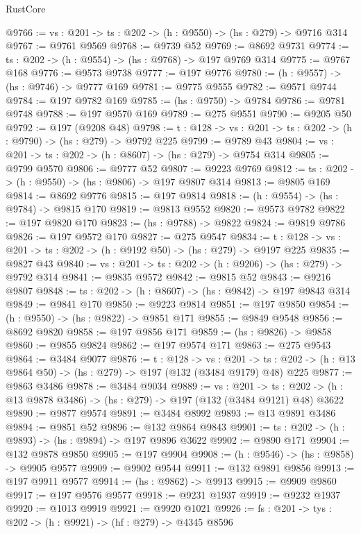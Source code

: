 \begin{lexlean}{RustCore}
\begin{coremodule}
@9766 := {vs : @201} -> {ts : @202} -> (h : @9550) -> (hs : @279) -> @9716 @314
@9767 := @9761 @9569
@9768 := @9739 @52
@9769 := @8692 @9731
@9774 := {ts : @202} -> (h : @9554) -> (hs : @9768) -> @197 @9769 @314
@9775 := @9767 @168
@9776 := @9573 @9738
@9777 := @197 @9776
@9780 := (h : @9557) -> (hs : @9746) -> @9777 @169
@9781 := @9775 @9555
@9782 := @9571 @9744
@9784 := @197 @9782 @169
@9785 := (hs : @9750) -> @9784
@9786 := @9781 @9748
@9788 := @197 @9570 @169
@9789 := @275 @9551
@9790 := @9205 @50
@9792 := @197 (@9208 @48)
@9798 := {t : @128} -> {vs : @201} -> {ts : @202} -> (h : @9790) -> (hs : @279) -> @9792 @225
@9799 := @9789 @43
@9804 := {vs : @201} -> {ts : @202} -> (h : @8607) -> (hs : @279) -> @9754 @314
@9805 := @9799 @9570
@9806 := @9777 @52
@9807 := @9223 @9769
@9812 := {ts : @202} -> (h : @9550) -> (hs : @9806) -> @197 @9807 @314
@9813 := @9805 @169
@9814 := @8692 @9776
@9815 := @197 @9814
@9818 := (h : @9554) -> (hs : @9784) -> @9815 @170
@9819 := @9813 @9552
@9820 := @9573 @9782
@9822 := @197 @9820 @170
@9823 := (hs : @9788) -> @9822
@9824 := @9819 @9786
@9826 := @197 @9572 @170
@9827 := @275 @9547
@9834 := {t : @128} -> {vs : @201} -> {ts : @202} -> (h : @9192 @50) -> (hs : @279) -> @9197 @225
@9835 := @9827 @43
@9840 := {vs : @201} -> {ts : @202} -> (h : @9206) -> (hs : @279) -> @9792 @314
@9841 := @9835 @9572
@9842 := @9815 @52
@9843 := @9216 @9807
@9848 := {ts : @202} -> (h : @8607) -> (hs : @9842) -> @197 @9843 @314
@9849 := @9841 @170
@9850 := @9223 @9814
@9851 := @197 @9850
@9854 := (h : @9550) -> (hs : @9822) -> @9851 @171
@9855 := @9849 @9548
@9856 := @8692 @9820
@9858 := @197 @9856 @171
@9859 := (hs : @9826) -> @9858
@9860 := @9855 @9824
@9862 := @197 @9574 @171
@9863 := @275 @9543
@9864 := @3484 @9077
@9876 := {t : @128} ->
  {vs : @201} ->
  {ts : @202} -> (h : @13 @9864 @50) -> (hs : @279) -> @197 (@132 (@3484 @9179) @48) @225
@9877 := @9863 @3486
@9878 := @3484 @9034
@9889 := {vs : @201} ->
  {ts : @202} -> (h : @13 @9878 @3486) -> (hs : @279) -> @197 (@132 (@3484 @9121) @48) @3622
@9890 := @9877 @9574
@9891 := @3484 @8992
@9893 := @13 @9891 @3486
@9894 := @9851 @52
@9896 := @132 @9864 @9843
@9901 := {ts : @202} -> (h : @9893) -> (hs : @9894) -> @197 @9896 @3622
@9902 := @9890 @171
@9904 := @132 @9878 @9850
@9905 := @197 @9904
@9908 := (h : @9546) -> (hs : @9858) -> @9905 @9577
@9909 := @9902 @9544
@9911 := @132 @9891 @9856
@9913 := @197 @9911 @9577
@9914 := (hs : @9862) -> @9913
@9915 := @9909 @9860
@9917 := @197 @9576 @9577
@9918 := @9231 @1937
@9919 := @9232 @1937
@9920 := @1013 @9919
@9921 := @9920 @1021
@9926 := {fs : @201} -> {tys : @202} -> (h : @9921) -> (hf : @279) -> @4345 @8596

\end{coremodule}
\end{lexlean}
